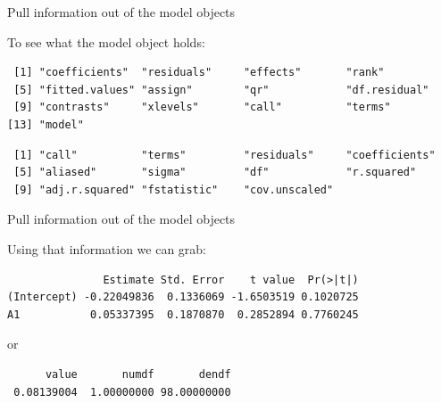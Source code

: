 \begin{frame}[fragile]{Pull information out of the model objects}

To see what the model object holds: \small

\begin{Shaded}
\begin{Highlighting}[]
\end{Highlighting}
\end{Shaded}

\begin{verbatim}
 [1] "coefficients"  "residuals"     "effects"       "rank"         
 [5] "fitted.values" "assign"        "qr"            "df.residual"  
 [9] "contrasts"     "xlevels"       "call"          "terms"        
[13] "model"        
\end{verbatim}

\begin{Shaded}
\begin{Highlighting}[]
\NormalTok{(}
\end{Highlighting}
\end{Shaded}

\begin{verbatim}
 [1] "call"          "terms"         "residuals"     "coefficients" 
 [5] "aliased"       "sigma"         "df"            "r.squared"    
 [9] "adj.r.squared" "fstatistic"    "cov.unscaled" 
\end{verbatim}

\end{frame}

\begin{frame}[fragile]{Pull information out of the model objects}

\center
Using that information we can grab:

\begin{Shaded}
\begin{Highlighting}[]
\OperatorTok{$}
\end{Highlighting}
\end{Shaded}

\begin{verbatim}
               Estimate Std. Error    t value  Pr(>|t|)
(Intercept) -0.22049836  0.1336069 -1.6503519 0.1020725
A1           0.05337395  0.1870870  0.2852894 0.7760245
\end{verbatim}

or

\begin{Shaded}
\begin{Highlighting}[]
\OperatorTok{$}
\end{Highlighting}
\end{Shaded}

\begin{verbatim}
      value       numdf       dendf 
 0.08139004  1.00000000 98.00000000 
\end{verbatim}

\end{frame}

